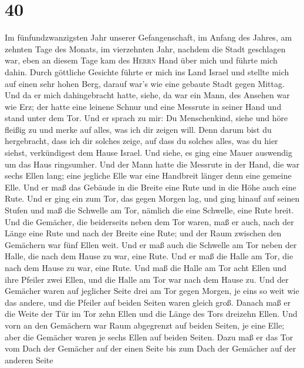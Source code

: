 \hypertarget{section-39}{%
\section{40}\label{section-39}}

 Im fünfundzwanzigsten Jahr unserer Gefangenschaft, im
Anfang des Jahres, am zehnten Tage des Monats, im vierzehnten Jahr,
nachdem die Stadt geschlagen war, eben an diesem Tage kam des
\textsc{Herrn} Hand über mich und führte mich dahin. 
Durch göttliche Gesichte führte er mich ins Land Israel und stellte mich
auf einen sehr hohen Berg, darauf war's wie eine gebaute Stadt gegen
Mittag.  Und da er mich dahingebracht hatte, siehe, da war
ein Mann, des Ansehen war wie Erz; der hatte eine leinene Schnur und
eine Messrute in seiner Hand und stand unter dem Tor.  Und
er sprach zu mir: Du Menschenkind, siehe und höre fleißig zu und merke
auf alles, was ich dir zeigen will. Denn darum bist du hergebracht, dass
ich dir solches zeige, auf dass du solches alles, was du hier siehst,
verkündigest dem Hause Israel.  Und siehe, es ging eine
Mauer auswendig um das Haus ringsumher. Und der Mann hatte die Messrute
in der Hand, die war sechs Ellen lang; eine jegliche Elle war eine
Handbreit länger denn eine gemeine Elle. Und er maß das Gebäude in die
Breite eine Rute und in die Höhe auch eine Rute.  Und er
ging ein zum Tor, das gegen Morgen lag, und ging hinauf auf seinen
Stufen und maß die Schwelle am Tor, nämlich die eine Schwelle, eine Rute
breit.  Und die Gemächer, die beiderseits neben dem Tor
waren, maß er auch, nach der Länge eine Rute und nach der Breite eine
Rute; und der Raum zwischen den Gemächern war fünf Ellen weit. Und er
maß auch die Schwelle am Tor neben der Halle, die nach dem Hause zu war,
eine Rute.  Und er maß die Halle am Tor, die nach dem
Hause zu war, eine Rute.  Und maß die Halle am Tor acht
Ellen und ihre Pfeiler zwei Ellen, und die Halle am Tor war nach dem
Hause zu.  Und der Gemächer waren auf jeglicher Seite
drei am Tor gegen Morgen, je eins so weit wie das andere, und die
Pfeiler auf beiden Seiten waren gleich groß.  Danach maß
er die Weite der Tür im Tor zehn Ellen und die Länge des Tors dreizehn
Ellen.  Und vorn an den Gemächern war Raum abgegrenzt auf
beiden Seiten, je eine Elle; aber die Gemächer waren je sechs Ellen auf
beiden Seiten.  Dazu maß er das Tor vom Dach der Gemächer
auf der einen Seite bis zum Dach der Gemächer auf der anderen Seite
